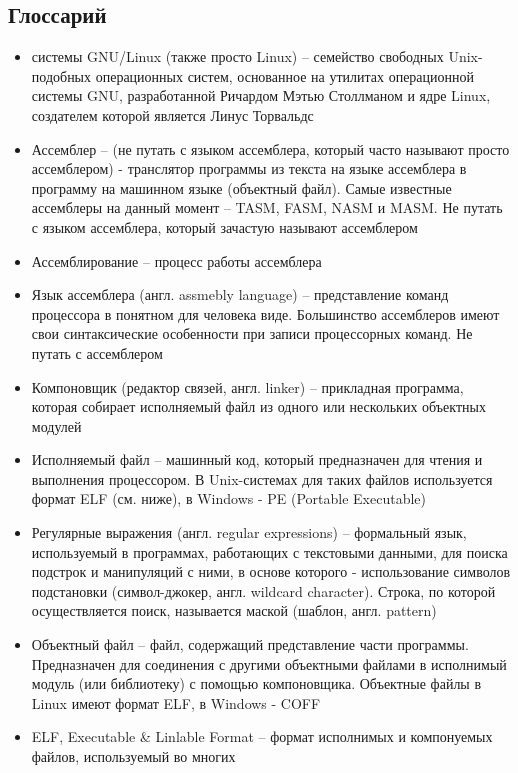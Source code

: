 \documentclass[a4paper]{article}
\begin{document}
	\subsection{Глоссарий}
	\begin{itemize}
		\item системы GNU/Linux (также просто Linux) -- семейство
			свободных Unix-подобных операционных систем, основанное
			на утилитах операционной системы GNU, разработанной
			Ричардом Мэтью Столлманом и ядре Linux, создателем
			которой является Линус Торвальдс
		\item Ассемблер -- (не путать с языком ассемблера, который часто
			называют просто ассемблером) - транслятор программы из
			текста на языке ассемблера в программу на машинном
			языке (объектный файл). Самые известные ассемблеры на
			данный момент -- TASM, FASM, NASM и MASM. Не путать с
			языком ассемблера, который зачастую называют ассемблером
		\item Ассемблирование -- процесс работы ассемблера
		\item Язык ассемблера (англ. assmebly language) -- представление
			команд процессора в понятном для человека виде.
			Большинство ассемблеров имеют свои синтаксические
			особенности при записи процессорных команд. Не путать с
			ассемблером
		\item Компоновщик (редактор связей, англ. linker) -- прикладная
			программа, которая собирает исполняемый файл из одного
			или нескольких объектных модулей
		\item Исполняемый файл -- машинный код, который предназначен
			для чтения и выполнения процессором. В Unix-системах
			для таких файлов используется формат ELF (см. ниже), в
			Windows - PE (Portable Executable)
		\item Регулярные выражения (англ. regular expressions) --
			формальный язык, используемый в программах, работающих с
			текстовыми данными, для поиска подстрок и манипуляций с
			ними, в основе которого - использование символов
			подстановки (символ-джокер, англ. wildcard character).
			Строка, по которой осуществляется поиск, называется
			маской (шаблон, англ. pattern)
		\item Объектный файл -- файл, содержащий представление части
			программы. Предназначен для соединения с другими
			объектными файлами в исполнимый модуль (или библиотеку)
			с помощью компоновщика. Объектные файлы в Linux имеют
			формат ELF, в Windows - COFF
		\item ELF, Executable \& Linlable Format -- формат исполнимых и
			компонуемых файлов, используемый во многих

\end{itemize}
\end{document}
